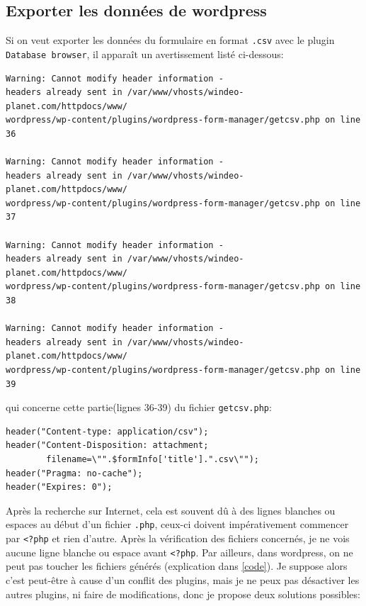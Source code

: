 \subsection{Exporter les données de wordpress}
\label{donnee}
Si on veut exporter les données du formulaire en format \texttt{.csv} avec le plugin \texttt{Database browser}, il apparaît un avertissement listé ci-dessous:\\
 
\begin{verbatim}
Warning: Cannot modify header information - 
headers already sent in /var/www/vhosts/windeo-planet.com/httpdocs/www/
wordpress/wp-content/plugins/wordpress-form-manager/getcsv.php on line 36

Warning: Cannot modify header information - 
headers already sent in /var/www/vhosts/windeo-planet.com/httpdocs/www/
wordpress/wp-content/plugins/wordpress-form-manager/getcsv.php on line 37

Warning: Cannot modify header information - 
headers already sent in /var/www/vhosts/windeo-planet.com/httpdocs/www/
wordpress/wp-content/plugins/wordpress-form-manager/getcsv.php on line 38

Warning: Cannot modify header information - 
headers already sent in /var/www/vhosts/windeo-planet.com/httpdocs/www/
wordpress/wp-content/plugins/wordpress-form-manager/getcsv.php on line 39
\end{verbatim}

qui concerne cette partie(lignes 36-39) du fichier \texttt{getcsv.php}:
\begin{verbatim}
header("Content-type: application/csv");
header("Content-Disposition: attachment; 
        filename=\"".$formInfo['title'].".csv\"");
header("Pragma: no-cache");
header("Expires: 0");
\end{verbatim}

Après la recherche sur Internet, cela est souvent dû à des lignes blanches ou espaces au début d'un fichier \texttt{.php}, ceux-ci doivent impérativement commencer par \texttt{<?php} et rien d'autre.
Après la vérification des fichiers concernés, je ne vois aucune ligne blanche ou espace avant \texttt{<?php}. Par ailleurs,  
dans wordpress, on ne peut pas toucher les fichiers générés (explication dans \ref{code}). Je suppose alors c'est peut-être à cause d'un conflit des plugins, mais je ne peux pas désactiver les autres plugins, ni faire de modifications, 
donc je propose deux solutions possibles:\\

